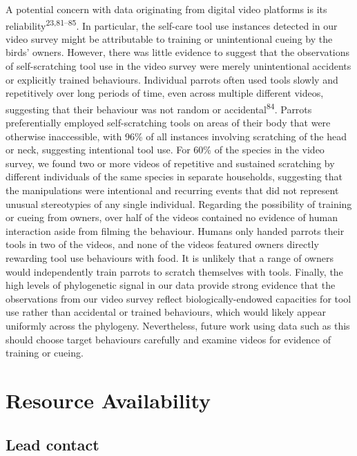 \documentclass[
  man, donotrepeattitle,floatsintext]{apa6}
\begin{document}
A potential concern with data originating from digital video platforms is its
reliability\textsuperscript{23,81--85}.
In particular, the self-care tool use instances detected in our video survey
might be attributable to training or unintentional cueing by the birds' owners.
However, there was little evidence to suggest that the observations of
self-scratching tool use in the video survey were merely unintentional accidents
or explicitly trained behaviours. Individual parrots often used tools slowly and
repetitively over long periods of time, even across multiple different videos,
suggesting that their behaviour was not random or accidental\textsuperscript{84}.
Parrots preferentially employed self-scratching tools on areas of their body
that were otherwise inaccessible, with 96\% of all instances involving scratching
of the head or neck, suggesting intentional tool use. For 60\% of the species in
the video survey, we found two or more videos of repetitive and sustained
scratching by different individuals of the same species in separate households,
suggesting that the manipulations were intentional and recurring events that did
not represent unusual stereotypies of any single individual. Regarding the
possibility of training or cueing from owners, over half of the videos contained
no evidence of human interaction aside from filming the behaviour. Humans only
handed parrots their tools in two of the videos, and none of the videos featured
owners directly rewarding tool use behaviours with food. It is unlikely that
a range of owners would independently train parrots to scratch themselves with
tools. Finally, the high levels of phylogenetic signal in our data provide
strong evidence that the observations from our video survey reflect
biologically-endowed capacities for tool use rather than accidental or trained
behaviours, which would likely appear uniformly across the phylogeny.
Nevertheless, future work using data such as this should choose target
behaviours carefully and examine videos for evidence of training or cueing.

\newpage

\hypertarget{resource-availability}{%
\section{Resource Availability}\label{resource-availability}}

\hypertarget{lead-contact}{%
\subsection{Lead contact}\label{lead-contact}}
\end{document}
